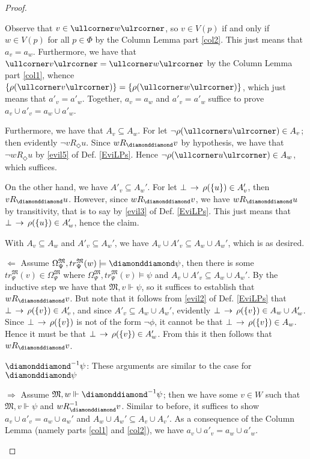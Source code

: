 \documentclass[11pt]{article}
\newcommand{\DD}{\diamonddiamond}
\newcommand{\Pos}{\Diamond}
\newcommand{\lc}{\ullcorner}
\newcommand{\rc}{\ulrcorner}
\begin{document}
\begin{proof}
\begin{peano}
\begin{peano}
	Observe that $v \in \lc w \rc$, so $v \in V(p)$ if and only if $w \in V(p)$ for all $p \in \Phi$ by the Column Lemma part \ref{col2}.  This just means that $a_v = a_w$.  Furthermore, we have that $\lc v \rc = \lc w \rc$ by the Column Lemma part \ref{col1}, whence $\{ \rho(\lc v \rc) \} = \{ \rho(\lc w \rc) \}$, which just means that $a'_v = a'_w$.  Together, $a_v = a_w$ and $a'_v = a'_w$ suffice to prove $a_v \cup a'_v = a_w \cup a'_w$.
	
	Furthermore, we have that $A_v \subseteq A_w$.  For let $\neg \rho(\lc u\rc) \in  A_v$; then evidently $\neg v R_\Pos u$.  Since $w R_\DD v$ by hypothesis, we have that $\neg w R_\Pos u$ by \ref{evil5} of Def. \ref{EviLPs}.  Hence $\neg \rho(\lc u\rc) \in A_w$, which suffices.
	
	On the other hand, we have $A'_v \subseteq A_w'$. For let $\bot \,\rightarrow\, \rho(\{ u \}) \in A'_v$, then $v R_\DD u$.  However, since $w R_\DD v$, we have $w R_\DD u$ by transitivity, that is to say by \ref{evil3} of Def. \ref{EviLPs}.  This just means that $\bot \,\rightarrow\, \rho(\{ u \}) \in A'_w$, hence the claim.
	
	With $A_v \subseteq A_w$ and $A'_v \subseteq A_w'$, we have $A_v \cup A'_v \subseteq A_w \cup A_w'$, which is as desired.
	
	\item $\Leftarrow$  Assume $\Omega_{\Psi}^\mathfrak{M}, tr_{\Psi}^\mathfrak{M}(w) \models \DD\psi$, then there is some $tr_{\Psi}^\mathfrak{M}(v) \in \Omega_{\Psi}^\mathfrak{M}$ where $\Omega_{\Psi}^\mathfrak{M}, tr_{\Psi}^\mathfrak{M}(v) \models \psi$ and $A_v \cup A'_v \subseteq A_w \cup A_w'$.  By the inductive step we have that $\mathfrak{M},v \Vdash \psi$, so it suffices to establish that $w R_\DD v$.  But note that it follows from \ref{evil2} of Def. \ref{EviLPs} that $\bot \,\rightarrow\, \rho(\{v\}) \in A'_v$, and since $A'_v \subseteq A_w \cup A_w'$, evidently $\bot \,\rightarrow\, \rho(\{v\}) \in A_w \cup A_w'$.  Since $\bot \,\rightarrow\, \rho(\{v\})$ is not of the form $\neg \phi$, it cannot be that $\bot \,\rightarrow\, \rho(\{v\})\in A_w$.  Hence it must be that $\bot \,\rightarrow\, \rho(\{v\}) \in A'_w$.  From this it then follows that $w R_\DD v$.
 \end{peano}
 \item $\DD^{-1} \psi$: These arguments are similar to the case for $\DD \psi$
 \begin{peano}
 	\item $\Rightarrow$ Assume $\mathfrak{M},w \Vdash \DD^{-1} \psi$; then we have some $v \in W$ such that $\mathfrak{M},v \Vdash \psi$ and $w R_\DD^{-1} v$.  Similar to before, it suffices to show $a_v \cup a'_v = a_w \cup a_w'$ and $A_w \cup A_w' \subseteq A_v \cup A_v'$.  As a consequence of the Column Lemma (namely parts \ref{col1} and \ref{col2}), we have $a_v \cup a'_v = a_w \cup a'_w$.
	

\end{peano}
\end{peano}
\end{proof}
\end{document}
